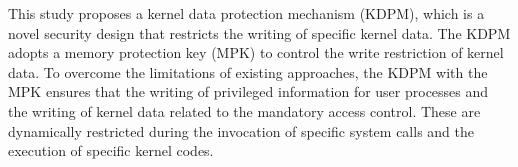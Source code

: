   This study proposes a kernel data protection mechanism (KDPM), which is a
  novel security design that restricts the writing of specific kernel data. 
  The KDPM adopts a memory protection key (MPK) to control the write
  restriction of kernel data. 
  To overcome the limitations of existing approaches, the KDPM with the MPK
  ensures that the writing of privileged information for user processes and the
  writing of kernel data related to the mandatory access control.
  These are dynamically restricted during the invocation of specific system
  calls and the execution of specific kernel codes.
